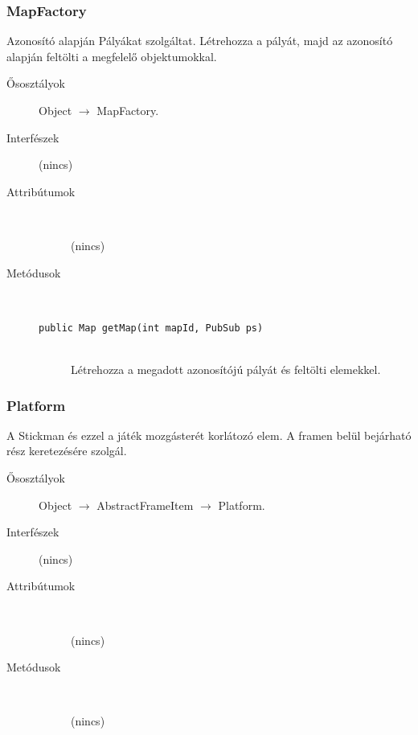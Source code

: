 		\subsubsection{MapFactory}
				 Azonosító alapján Pályákat szolgáltat.  Létrehozza a pályát, majd az azonosító alapján feltölti  a megfelelő objektumokkal. 			\begin{description}


				\item[Ősosztályok] Object $\rightarrow{}$ MapFactory.
				\item[Interfészek] (nincs)
				\item[Attribútumok]$\ $
					\begin{description}
						\item[] (nincs)
					\end{description}
				\item[Metódusok]$\ $
					\begin{description}
						\item[\texttt{public Map getMap(int mapId, PubSub ps)}] \hfill \\ Létrehozza a megadott azonosítójú pályát  és feltölti elemekkel. 
					\end{description}
			\end{description}

		\subsubsection{Platform}
				 A Stickman és ezzel a játék mozgásterét korlátozó elem. A framen belül bejárható rész keretezésére szolgál. 			\begin{description}


				\item[Ősosztályok] Object $\rightarrow{}$ AbstractFrameItem $\rightarrow{}$ Platform.
				\item[Interfészek] (nincs)
				\item[Attribútumok]$\ $
					\begin{description}
						\item[] (nincs)
					\end{description}
				\item[Metódusok]$\ $
					\begin{description}
						\item[] (nincs)
					\end{description}
			\end{description}

